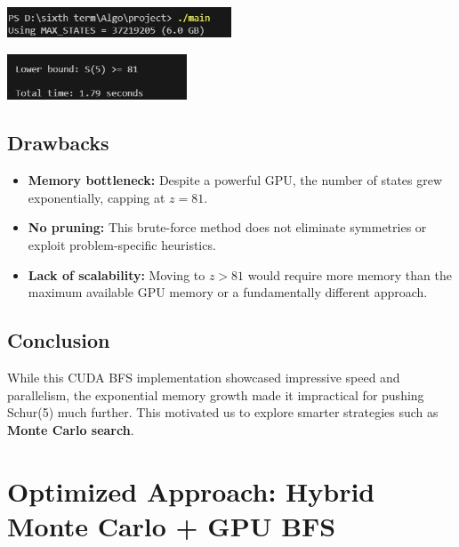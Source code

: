 \documentclass[12pt]{article}
\begin{document}
\noindent
\begin{minipage}{\textwidth}
    \centering
    \includegraphics[width=0.5\textwidth]{images/figure_1.jpg}
\end{minipage}

\vspace{1em}

\noindent
\begin{minipage}{\textwidth}
    \centering
    \includegraphics[width=0.4\textwidth]{images/gpu_based.png}
\end{minipage}

\subsection*{Drawbacks}
\begin{itemize}
    \item \textbf{Memory bottleneck:} Despite a powerful GPU, the number of states grew exponentially, capping at \( z = 81 \).
    \item \textbf{No pruning:} This brute-force method does not eliminate symmetries or exploit problem-specific heuristics.
    \item \textbf{Lack of scalability:} Moving to \( z > 81 \) would require more memory than the maximum available GPU memory or a fundamentally different approach.
\end{itemize}

\subsection*{Conclusion}
While this CUDA BFS implementation showcased impressive speed and parallelism, the exponential memory growth made it impractical for pushing Schur(5) much further. This motivated us to explore smarter strategies such as \textbf{Monte Carlo search}.


\newpage

\section{Optimized Approach: Hybrid Monte Carlo + GPU BFS}
\end{document}
